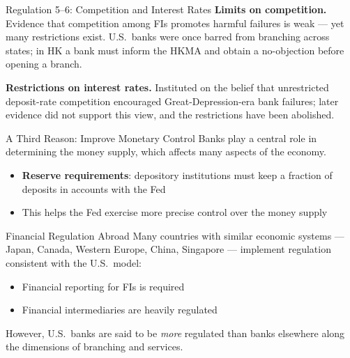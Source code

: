 \documentclass[aspectratio=169]{beamer}
\begin{document}
\begin{frame}{Regulation 5--6: Competition and Interest Rates}
\textbf{Limits on competition.} Evidence that competition among FIs promotes harmful failures is weak --- yet many restrictions exist. U.S.\ banks were once barred from branching across states; in HK a bank must inform the HKMA and obtain a no-objection before opening a branch.
\vspace{0.3em}

\textbf{Restrictions on interest rates.} Instituted on the belief that unrestricted deposit-rate competition encouraged Great-Depression-era bank failures; later evidence did not support this view, and the restrictions have been abolished.
\end{frame}

\begin{frame}{A Third Reason: Improve Monetary Control}
Banks play a central role in determining the money supply, which affects many aspects of the economy.
\begin{itemize}
  \item \textbf{Reserve requirements}: depository institutions must keep a fraction of deposits in accounts with the Fed
  \item This helps the Fed exercise more precise control over the money supply
\end{itemize}
\end{frame}

\begin{frame}{Financial Regulation Abroad}
Many countries with similar economic systems --- Japan, Canada, Western Europe, China, Singapore --- implement regulation consistent with the U.S.\ model:
\begin{itemize}
  \item Financial reporting for FIs is required
  \item Financial intermediaries are heavily regulated
\end{itemize}
\vspace{0.3em}
However, U.S.\ banks are said to be \emph{more} regulated than banks elsewhere along the dimensions of branching and services.
\end{frame}

\end{document}
